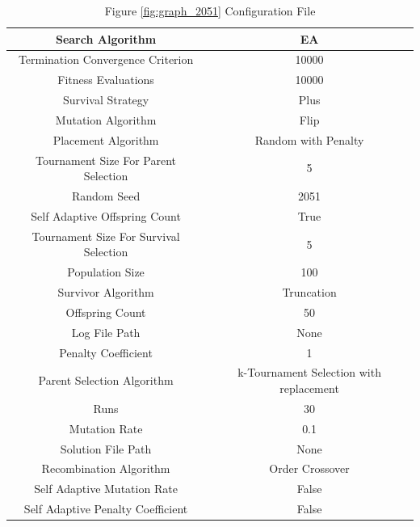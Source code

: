 \documentclass{standalone}
\begin{document}
\clearpage
\begin{table}[!htb]
	\centering
	\caption{Figure \ref{fig:graph_2051} Configuration File}
	\label{tab:graph_2051}
	\begin{tabular}{| c | c |}
		\hline
		Search Algorithm		& EA		 \\
		\hline
		Termination Convergence Criterion		& 10000		 \\
		\hline
		Fitness Evaluations		& 10000		 \\
		\hline
		Survival Strategy		& Plus		 \\
		\hline
		Mutation Algorithm		& Flip		 \\
		\hline
		Placement Algorithm		& Random with Penalty		 \\
		\hline
		Tournament Size For Parent Selection		& 5		 \\
		\hline
		Random Seed		& 2051		 \\
		\hline
		Self Adaptive Offspring Count		& True		 \\
		\hline
		Tournament Size For Survival Selection		& 5		 \\
		\hline
		Population Size		& 100		 \\
		\hline
		Survivor Algorithm		& Truncation		 \\
		\hline
		Offspring Count		& 50		 \\
		\hline
		Log File Path		& None		 \\
		\hline
		Penalty Coefficient		& 1		 \\
		\hline
		Parent Selection Algorithm		& k-Tournament Selection with replacement		 \\
		\hline
		Runs		& 30		 \\
		\hline
		Mutation Rate		& 0.1		 \\
		\hline
		Solution File Path		& None		 \\
		\hline
		Recombination Algorithm		& Order Crossover		 \\
		\hline
		Self Adaptive Mutation Rate		& False		 \\
		\hline
		Self Adaptive Penalty Coefficient		& False		 \\
		\hline
	\end{tabular}
\end{table}
\end{document}
